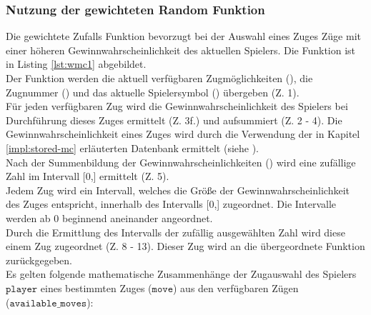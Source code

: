 \subsubsection{Nutzung der gewichteten Random Funktion}
Die gewichtete Zufalls Funktion bevorzugt bei der Auswahl eines Zuges Züge mit einer höheren Gewinnwahrscheinlichkeit des aktuellen Spielers. Die Funktion ist in Listing \ref{lst:wmc1} abgebildet.
\\Der Funktion werden die aktuell verfügbaren Zugmöglichkeiten (), die Zugnummer () und das aktuelle Spielersymbol () übergeben (Z. 1).
\\Für jeden verfügbaren Zug wird die Gewinnwahrscheinlichkeit des Spielers bei Durchführung dieses Zuges ermittelt (Z. 3f.) und aufsummiert (Z. 2 - 4). Die Gewinnwahrscheinlichkeit eines Zuges wird durch die Verwendung der in Kapitel \ref{impl:stored-mc} erläuterten Datenbank ermittelt (siehe ).
\\Nach der Summenbildung der Gewinnwahrscheinlichkeiten () wird eine zufällige Zahl im Intervall [0,] ermittelt (Z. 5).
\\Jedem Zug wird ein Intervall, welches die Größe der Gewinnwahrscheinlichkeit des Zuges entspricht, innerhalb des Intervalls [0,] zugeordnet. Die Intervalle werden ab 0 beginnend aneinander angeordnet. 
\\Durch die Ermittlung des Intervalls der zufällig ausgewählten Zahl wird diese einem Zug zugeordnet (Z. 8 - 13). 
Dieser Zug wird an die übergeordnete Funktion zurückgegeben.
\\Es gelten folgende mathematische Zusammenhänge der Zugauswahl des Spielers \\$\mathtt{player}$ eines bestimmten Zuges ($\mathtt{move}$) aus den verfügbaren Zügen\\ ($\mathtt{available\_moves}$):
